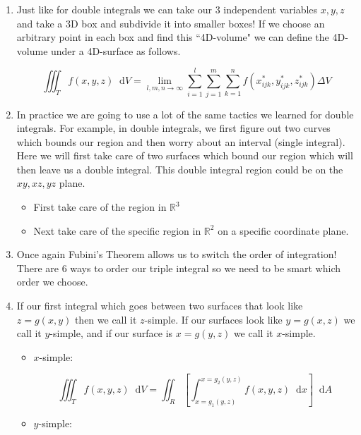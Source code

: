 \documentclass[11pt]{article}
\newcommand*\dif{\mathop{}\!\mathrm{d}}
\begin{document}
\begin{enumerate}
\item Just like for double integrals we can take our 3 independent variables $x,y,z$ and take a 3D box and subdivide it into smaller boxes! If we choose an arbitrary point in each box and find this ``4D-volume" we can define the 4D-volume under a 4D-surface as follows.

\begin{equation*}
    \iiint_T f(x,y,z) \dif{V} = \lim_{l,m,n \to \infty} \sum_{i=1}^l \sum_{j=1}^m \sum_{k=1}^n f(x^*_{ijk},y^*_{ijk},z^*_{ijk}) \Delta V
\end{equation*}


\item  In practice we are going to use a lot of the same tactics we learned for double integrals. For example, in double integrals, we first figure out two curves which bounds our region and then worry about an interval (single integral). Here we will first take care of two surfaces which bound our region which will then leave us a double integral. This double integral region could be on the $xy,xz,yz$ plane.

\begin{itemize}
    \item First take care of the region in $\mathbb{R}^3$
    \item Next take care of the specific region in $\mathbb{R}^2$ on a specific coordinate plane.
\end{itemize}

\item Once again Fubini's Theorem allows us to switch the order of integration! There are 6 ways to order our triple integral so we need to be smart which order we choose.

\item If our first integral which goes between two surfaces that look like $z = g(x,y)$ then we call it $z$-simple. If our surfaces look like $y = g(x,z)$ we call it $y$-simple, and if our surface is $x = g(y,z)$ we call it $x$-simple.

\begin{itemize}
    \item $x$-simple:
    
    \begin{equation*}
        \iiint_T f(x,y,z) \dif{V} = \iint_R \left[\int_{x = g_1(y,z)}^{x=g_2(y,z)} f(x,y,z) \dif{x} \right]\dif{A}
    \end{equation*}

        \item $y$-simple:
    

\end{itemize}
\end{enumerate}
\end{document}
